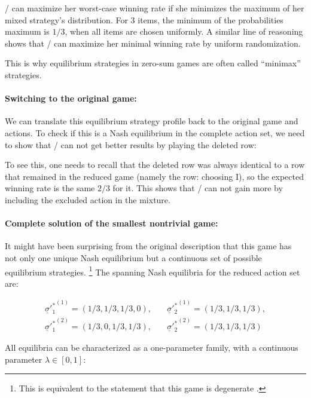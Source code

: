 \documentclass{article}
\theoremstyle{definition}
\begin{document}
\PI/ can maximize her worst-case winning rate if she minimizes the maximum of her mixed strategy's distribution. For $3$ items, the minimum of the probabilities maximum is $1/3$, when all items are chosen uniformly.
A similar line of reasoning shows that \PII/ can maximize her minimal winning rate by uniform randomization.

This is why equilibrium strategies in zero-sum games are often called ``minimax'' strategies.

\paragraph{Switching to the original game:}

We can translate this equilibrium strategy profile back to the original game and actions. To check if this is a Nash equilibrium in the complete action set, we need to show that \PI/ can not get better results by playing the deleted row: 

To see this, one needs to recall that the deleted row was always identical to a row that remained in the reduced game (namely the row: choosing I), so the expected winning rate is the same $2/3$ for it. This shows that \PI/ can not gain more by including the excluded action in the mixture.

\paragraph{Complete solution of the smallest nontrivial game:}

It might have been surprising from the original description that this game has not only one unique Nash equilibrium but a continuous set of possible equilibrium strategies. \footnote{This is equivalent to the statement that this game is degenerate \cite{book:AlgorithmicGameTheory}.} The spanning Nash equilibria for the reduced action set are:

\begin{equation}
    \begin{split}
        {\underline{\sigma}'^*_1}^{(1)}=(1/3,1/3,1/3,0), & \quad {\underline{\sigma}'^*_2}^{(1)}=(1/3,1/3,1/3), \\
        {\underline{\sigma}'^*_1}^{(2)}=(1/3,0,1/3,1/3), & \quad {\underline{\sigma}'^*_2}^{(2)}=(1/3,1/3,1/3)
    \end{split}
\end{equation}

All equilibria can be characterized as a one-parameter family, with a continuous parameter $\lambda \in [0,1]$:
\end{document}
